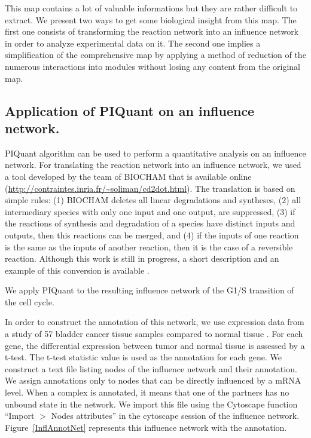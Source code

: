 \documentclass[10pt]{bmc_article}
\newenvironment{bmcformat}{\baselineskip20pt\sloppy\setboolean{publ}{false}}{\baselineskip20pt\sloppy}
\begin{document}
\begin{bmcformat}
This map contains a lot of valuable informations but they are rather difficult to extract. We present two
ways to get some biological insight from this map. The first one consists of
transforming the reaction network into an influence network in order to analyze
experimental data on it. The second one implies a simplification of the comprehensive map by
applying a method of reduction of the numerous interactions into modules without
losing any content from the original map.

\subsection*{Application of PIQuant on an influence network.}
PIQuant algorithm can be used to perform a quantitative analysis on an influence
network. For translating the reaction network into an influence network, we used
a tool developed by the team of BIOCHAM \cite{calzone2006biocham} that is
available online (\url{http://contraintes.inria.fr/~soliman/cd2dot.html}). The
translation is based on simple rules: (1) BIOCHAM deletes all linear
degradations and syntheses, (2) all intermediary species with only one input and
one output, are suppressed, (3) if the reactions of synthesis and degradation of
a species have distinct inputs and outputs, then this reactions can be merged,
and (4) if the inputs of one reaction is the same as the inputs of another
reaction, then it is the case of a reversible reaction. Although this work is
still in progress, a short description and an example of this conversion is available \cite{calzone2011calamar}. 

We apply PIQuant to the resulting influence network of the G1/S transition of
the cell cycle. 

In order to construct the annotation of this network, we use expression  data
from a study of 57 bladder cancer
tissue samples compared to normal tissue \cite{stransky2006regional}. For each 
gene, the differential expression between tumor and normal tissue
is assessed by a t-test. The t-test statistic value is used as the annotation
for each gene. We construct a text file listing nodes of the influence network 
and their annotation. We assign annotations only to nodes that can be directly
influenced by a 
mRNA level. When a complex is annotated, it means that one of the partners has
no unbound state in the network. 
We import this file using the Cytoscape function 
``Import $>$ Nodes attributes'' 
in the cytoscape session of the influence network.
Figure~\ref{InflAnnotNet} represents this influence network with the annotation.
 


\end{bmcformat}
\end{document}
